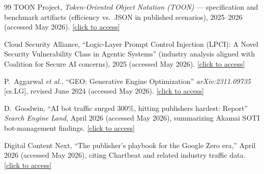 \documentclass[12pt,a4paper]{article}
\begin{document}
\begin{thebibliography}{99}
TOON Project, \textit{Token-Oriented Object Notation (TOON)} — specification and benchmark artifacts (efficiency vs.\ JSON in published scenarios), 2025--2026 (accessed May 2026). \href{https://github.com/toon-format/toon}{[click to access]}

Cloud Security Alliance, ``Logic-Layer Prompt Control Injection (LPCI): A Novel Security Vulnerability Class in Agentic Systems'' (industry analysis aligned with Coalition for Secure AI concerns), 2025 (accessed May 2026). \href{https://cloudsecurityalliance.org/articles/logic-layer-prompt-control-injection-lpci-a-novel-security-vulnerability-class-in-agentic-systems}{[click to access]}

P.~Aggarwal \textit{et al.}, ``GEO: Generative Engine Optimization'' \textit{arXiv:2311.09735} [cs.LG], revised June 2024 (accessed May 2026). \href{https://arxiv.org/abs/2311.09735}{[click to access]}

D.~Goodwin, ``AI bot traffic surged 300\%, hitting publishers hardest: Report'' \textit{Search Engine Land}, April 2026 (accessed May 2026), summarizing Akamai SOTI bot-management findings. \href{https://searchengineland.com/ai-bot-traffic-surged-publishers-report-473900}{[click to access]}

Digital Content Next, ``The publisher's playbook for the Google Zero era,'' April 2026 (accessed May 2026), citing Chartbeat and related industry traffic data. \href{https://digitalcontentnext.org/blog/2026/04/09/the-publishers-playbook-for-the-google-zero-era/}{[click to access]}

\end{thebibliography}
\end{document}
